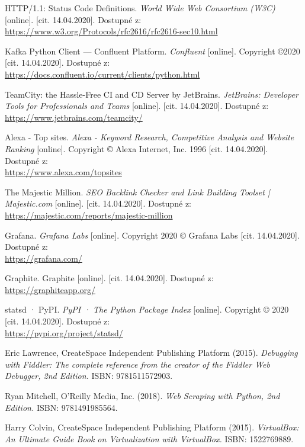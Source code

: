 \documentclass[thesis=M,czech,hidelinks]{FITthesis}[2013/05/06]
\begin{document}
\begin{thebibliography}{9}
	HTTP/1.1: Status Code Definitions. \textit{World Wide Web Consortium (W3C)} [online]. [cit. 14.04.2020]. Dostupné z: \\ 
	\url{https://www.w3.org/Protocols/rfc2616/rfc2616-sec10.html}
	
	Kafka Python Client — Confluent Platform. \textit{Confluent} [online]. Copyright ©2020 [cit. 14.04.2020]. Dostupné z:  \\ 
	\url{https://docs.confluent.io/current/clients/python.html}
	
	TeamCity: the Hassle-Free CI and CD Server by JetBrains. \textit{JetBrains: Developer Tools for Professionals and Teams} [online]. [cit. 14.04.2020]. Dostupné z: \\ 
	\url{https://www.jetbrains.com/teamcity/}
	
	Alexa - Top sites. \textit{Alexa - Keyword Research, Competitive Analysis and Website Ranking} [online]. Copyright © Alexa Internet, Inc. 1996 [cit. 14.04.2020]. Dostupné z:  \\ 
	\url{https://www.alexa.com/topsites}
	
	The Majestic Million. \textit{SEO Backlink Checker and Link Building Toolset | Majestic.com} [online]. [cit. 14.04.2020]. Dostupné z:  \\ 
	\url{https://majestic.com/reports/majestic-million}
	
	Grafana. \textit{Grafana Labs} [online]. Copyright 2020 © Grafana Labs [cit. 14.04.2020]. Dostupné z: \\
	\url{https://grafana.com/}
	
	Graphite. Graphite [online]. [cit. 14.04.2020]. Dostupné z: \\
	\url{https://graphiteapp.org/}
	
	
	statsd · PyPI. \textit{PyPI · The Python Package Index} [online]. Copyright © 2020 [cit. 14.04.2020]. Dostupné z: \\
	\url{https://pypi.org/project/statsd/}
	
	Eric Lawrence, CreateSpace Independent Publishing Platform (2015).\textit{ Debugging with
	Fiddler: The complete reference from the creator of the Fiddler Web Debugger, 2nd
	Edition.} ISBN: 9781511572903.
	
	Ryan Mitchell, O'Reilly Media, Inc. (2018). \textit{Web Scraping with Python, 2nd Edition.}
	ISBN: 9781491985564.
	
	Harry Colvin, CreateSpace Independent Publishing Platform (2015). \textit{VirtualBox: An
	Ultimate Guide Book on Virtualization with VirtualBox.} ISBN: 1522769889.
		
\end{thebibliography}
\end{document}
